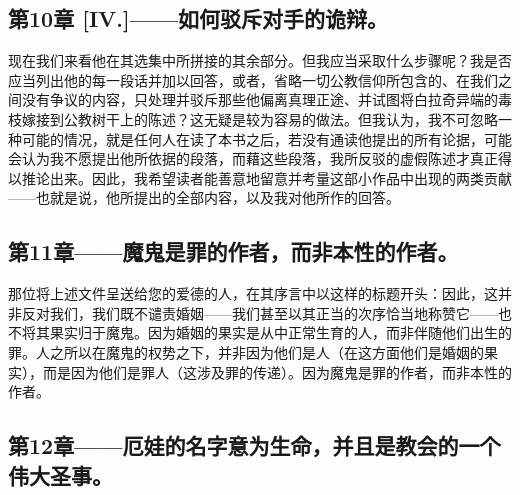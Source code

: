 \subsection{第10章 [IV.]——如何驳斥对手的诡辩。}

现在我们来看他在其选集中所拼接的其余部分。但我应当采取什么步骤呢？我是否应当列出他的每一段话并加以回答，或者，省略一切公教信仰所包含的、在我们之间没有争议的内容，只处理并驳斥那些他偏离真理正途、并试图将白拉奇异端的毒枝嫁接到公教树干上的陈述？这无疑是较为容易的做法。但我认为，我不可忽略一种可能的情况，就是任何人在读了本书之后，若没有通读他提出的所有论据，可能会认为我不愿提出他所依据的段落，而藉这些段落，我所反驳的虚假陈述才真正得以推论出来。因此，我希望读者能善意地留意并考量这部小作品中出现的两类贡献——也就是说，他所提出的全部内容，以及我对他所作的回答。\par


\subsection{第11章——魔鬼是罪的作者，而非本性的作者。}

那位将上述文件呈送给您的爱德的人，在其序言中以这样的标题开头：因此，这并非反对我们，我们既不谴责婚姻——我们甚至以其正当的次序恰当地称赞它——也不将其果实归于魔鬼。因为婚姻的果实是从中正常生育的人，而非伴随他们出生的罪。人之所以在魔鬼的权势之下，并非因为他们是人（在这方面他们是婚姻的果实），而是因为他们是罪人（这涉及罪的传递）。因为魔鬼是罪的作者，而非本性的作者。\par


\subsection{第12章——厄娃的名字意为生命，并且是教会的一个伟大圣事。}

